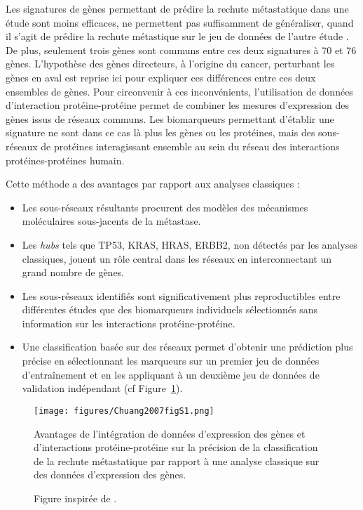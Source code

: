 			Les signatures de gènes permettant de prédire la rechute métastatique dans une étude sont moins efficaces, ne permettent pas suffisamment de généraliser, quand il s'agit de prédire la rechute métastique sur le jeu de données de l'autre étude \citep{EinDor2006}.
			De plus, seulement trois gènes sont communs entre ces deux signatures à 70 et 76 gènes.
			L'hypothèse des gènes directeurs, à l'origine du cancer, perturbant les gènes en aval est reprise ici pour expliquer ces différences entre ces deux ensembles de gènes.
			Pour circonvenir à ces inconvénients, l'utilisation de données d'interaction protéine-protéine permet de combiner les mesures d'expression des gènes issus de réseaux communs.
			Les biomarqueurs permettant d'établir une signature ne sont dans ce cas là plus les gènes ou les protéines, mais des sous-réseaux de protéines interagissant ensemble au sein du réseau des interactions protéines-protéines humain.

			Cette méthode a des avantages par rapport aux analyses classiques :
			\begin{itemize}
				\item Les sous-réseaux résultants procurent des modèles des mécanismes moléculaires sous-jacents de la métastase.
				\item Les \emph{hubs} tels que \acs{TP53}, \acs{KRAS}, \acs{HRAS}, \acs{ERBB2}, non détectés par les analyses classiques, jouent un rôle central dans les réseaux en interconnectant un grand nombre de gènes.
				\item Les sous-réseaux identifiés sont significativement plus reproductibles entre différentes études que des biomarqueurs individuels sélectionnés sans information sur les interactions protéine-protéine.
				\item Une classification basée sur des réseaux permet d'obtenir une prédiction plus précise en sélectionnant les marqueurs sur un premier jeu de données d'entraînement et en les appliquant à un deuxième jeu de données de validation indépendant (cf Figure~\ref{fig:Chuang2007figS1}).
			\end{itemize}

			\begin{figure}
				\centering
				\texttt{[image: figures/Chuang2007figS1.png]}
				\caption{Avantages de l'intégration de données d'expression des gènes et d'interactions protéine-protéine sur la précision de la classification de la rechute métastatique par rapport à une analyse classique sur des données d'expression des gènes.}
				\label{fig:Chuang2007figS1}
				\caption*{Figure inspirée de \citeauthor{Chuang2007}.}
			\end{figure}


